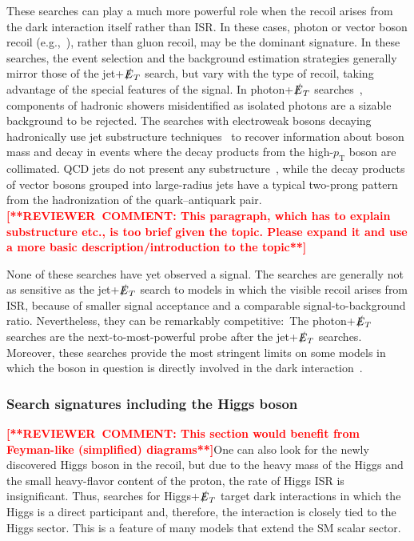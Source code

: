 \documentclass{ar-1col}
\newcommand{\pt}{\ensuremath{p_\mathrm{T}}\xspace}
\newcommand{\MET}{\ensuremath{\slashed{E}_T}\xspace}
\begin{document}
These searches can play a much more powerful role when the recoil
arises from the dark interaction itself rather than ISR. In these
cases, photon or vector boson recoil
(e.g.,~), rather than gluon
recoil, may be the dominant signature. In these searches, the
event selection and the background estimation strategies generally
mirror those of the jet+\MET search, but vary with the type of
recoil, taking advantage of the special features of the signal. In
photon+\MET searches~\cite{Aaboud:2017dor,CMS-PAS-EXO-16-014},
components of hadronic showers misidentified as isolated photons
are a sizable background to be rejected. The searches with
electroweak bosons decaying hadronically use jet substructure
techniques~\cite{Sirunyan:2017jix,Aaboud:2016qgg} to recover
information about boson mass and decay in events where the decay
products from the high-\pt{} boson are collimated. QCD jets do
not present any substructure~\cite{Larkoski:2017jix}, while the
decay products of vector bosons grouped into large-radius jets
have a typical two-prong pattern from the hadronization of the
quark--antiquark pair.\textbf{\textcolor{red}{[**REVIEWER\ COMMENT: This paragraph, which has to explain substructure etc., is too brief given the topic.  Please expand it and use a more basic description/introduction to the topic**]}}

None of these searches have yet observed a signal. The searches are generally not
as sensitive as the jet+\MET search to models in which the
visible recoil arises from ISR, because of smaller signal
acceptance and a comparable signal-to-background ratio. Nevertheless, they can
be remarkably competitive:\ The
photon+\MET searches are the next-to-most-powerful probe after the jet+\MET searches. Moreover,
these searches provide the most stringent limits on some models
in which the boson in question is directly involved in the dark
interaction~\cite{Berlin:2014cfa}.

\subsubsection{Search signatures including the Higgs boson}

\textbf{\textcolor{red}{[**REVIEWER\ COMMENT: This section would benefit from Feyman-like (simplified) diagrams**]}}One can also look for the newly discovered Higgs boson in the
recoil, but due to the heavy mass of the Higgs and the small
heavy-flavor content of the proton, the rate of Higgs ISR is
insignificant. Thus, searches for Higgs+\MET target dark
interactions in which the Higgs is a direct participant and,
therefore, the interaction is closely tied to the Higgs sector.
This is a feature of many models that extend the SM scalar sector.
\end{document}
